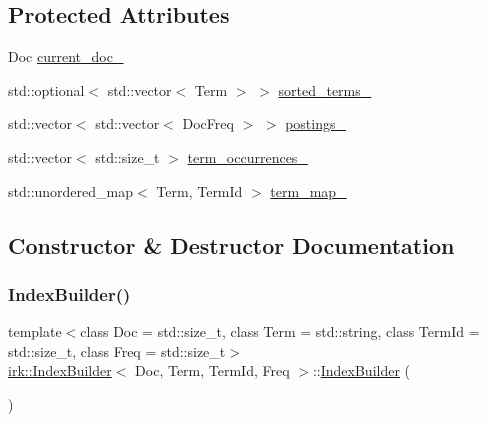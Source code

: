 \subsection*{Protected Attributes}
\begin{DoxyCompactItemize}
\item 
Doc \mbox{\hyperlink{classirk_1_1IndexBuilder_a686ec90f6312863985cd1c5ece74834f}{current\+\_\+doc\+\_\+}}
\item 
std\+::optional$<$ std\+::vector$<$ Term $>$ $>$ \mbox{\hyperlink{classirk_1_1IndexBuilder_ae0643be514bd41bd60f48cf562ac0c43}{sorted\+\_\+terms\+\_\+}}
\item 
std\+::vector$<$ std\+::vector$<$ Doc\+Freq $>$ $>$ \mbox{\hyperlink{classirk_1_1IndexBuilder_ab1834f3af5506988bb30bf8722dd3655}{postings\+\_\+}}
\item 
std\+::vector$<$ std\+::size\+\_\+t $>$ \mbox{\hyperlink{classirk_1_1IndexBuilder_a3cc49bbc84aafe3f26bb215b37b720a0}{term\+\_\+occurrences\+\_\+}}
\item 
std\+::unordered\+\_\+map$<$ Term, Term\+Id $>$ \mbox{\hyperlink{classirk_1_1IndexBuilder_a5d0bc3ee10185051faf082e22fb77410}{term\+\_\+map\+\_\+}}
\end{DoxyCompactItemize}


\subsection{Constructor \& Destructor Documentation}
\mbox{\label{classirk_1_1IndexBuilder_aca3e87f67aeea3bf4b3491c867a0eac1}} 
\subsubsection{\texorpdfstring{Index\+Builder()}{IndexBuilder()}}
{\footnotesize\ttfamily template$<$class Doc  = std\+::size\+\_\+t, class Term  = std\+::string, class Term\+Id  = std\+::size\+\_\+t, class Freq  = std\+::size\+\_\+t$>$ \\
\mbox{\hyperlink{classirk_1_1IndexBuilder}{irk\+::\+Index\+Builder}}$<$ Doc, Term, Term\+Id, Freq $>$\+::\mbox{\hyperlink{classirk_1_1IndexBuilder}{Index\+Builder}} (\begin{DoxyParamCaption}{ }\end{DoxyParamCaption})\hspace{0.3cm}{\ttfamily [inline]}}



